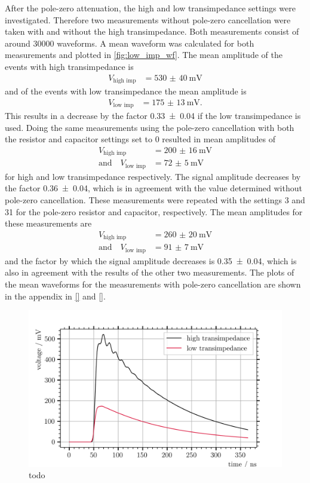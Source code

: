 After the pole-zero attenuation, the high and low transimpedance settings were investigated.
Therefore two measurements without pole-zero cancellation were taken with and without the high transimpedance.
Both measurements consist of around \num{30000} waveforms.
A mean waveform was calculated for both measurements and plotted in \autoref{fig:low_imp_wf}.
The mean amplitude of the events with high transimpedance is
\begin{align}
	V_\text{high imp} &= \SI{530(40)}{\milli\volt}
\end{align}
and of the events with low transimpedance the mean amplitude is
\begin{align}
	V_\text{low imp} &= \SI{175(13)}{\milli\volt}.
\end{align}
This results in a decrease by the factor \num{0.33(4)} if the low transimpedance is used.
Doing the same measurements using the pole-zero cancellation with both the resistor and capacitor settings set to 0 resulted in mean amplitudes of
\begin{align}
	V_\text{high imp} &= \SI{200(16)}{\milli\volt}\\
	\text{and}\quad V_\text{low imp} &= \SI{72(5)}{\milli\volt}
\end{align}
for high and low transimpedance respectively.
The signal amplitude decreases by the factor \num{0.36(4)}, which is in agreement with the value determined without pole-zero cancellation.
These measurements were repeated with the settings 3 and 31 for the pole-zero resistor and capacitor, respectively.
The mean amplitudes for these measurements are
\begin{align}
	V_\text{high imp} &= \SI{260(20)}{\milli\volt}\\
	\text{and}\quad V_\text{low imp} &= \SI{91(7)}{\milli\volt}
\end{align}
and the factor by which the signal amplitude decreases is \num{0.35(4)}, which is also in agreement with the results of the other two measurements.
The plots of the mean waveforms for the measurements with pole-zero cancellation are shown in the appendix in \autoref{} and \autoref{}.
\begin{figure}
	\centering
	\includegraphics[width=1.\textwidth]{pictures/low_imp_mean_wf.png}
	\caption[todo]{todo}
	\label{fig:low_imp_wf}
\end{figure}

